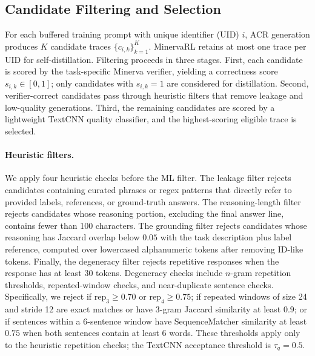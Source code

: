\subsection{Candidate Filtering and Selection}
\label{subsec:acr-filtering}

For each buffered training prompt with unique identifier (UID) $i$, ACR generation produces $K$ candidate traces $\{c_{i,k}\}_{k=1}^{K}$. MinervaRL retains at most one trace per UID for self-distillation. Filtering proceeds in three stages. First, each candidate is scored by the task-specific Minerva verifier, yielding a correctness score $s_{i,k}\in[0,1]$; only candidates with $s_{i,k}=1$ are considered for distillation. Second, verifier-correct candidates pass through heuristic filters that remove leakage and low-quality generations. Third, the remaining candidates are scored by a lightweight TextCNN quality classifier, and the highest-scoring eligible trace is selected.

\paragraph{Heuristic filters.}
We apply four heuristic checks before the ML filter. The leakage filter rejects candidates containing curated phrases or regex patterns that directly refer to provided labels, references, or ground-truth answers. The reasoning-length filter rejects candidates whose reasoning portion, excluding the final answer line, contains fewer than 100 characters. The grounding filter rejects candidates whose reasoning has Jaccard overlap below $0.05$ with the task description plus label reference, computed over lowercased alphanumeric tokens after removing ID-like tokens. Finally, the degeneracy filter rejects repetitive responses when the response has at least 30 tokens. Degeneracy checks include $n$-gram repetition thresholds, repeated-window checks, and near-duplicate sentence checks. Specifically, we reject if $\mathrm{rep}_3\ge 0.70$ or $\mathrm{rep}_4\ge 0.75$; if repeated windows of size 24 and stride 12 are exact matches or have 3-gram Jaccard similarity at least $0.9$; or if sentences within a 6-sentence window have SequenceMatcher similarity at least $0.75$ when both sentences contain at least 6 words. These thresholds apply only to the heuristic repetition checks; the TextCNN acceptance threshold is $\tau_q=0.5$.

